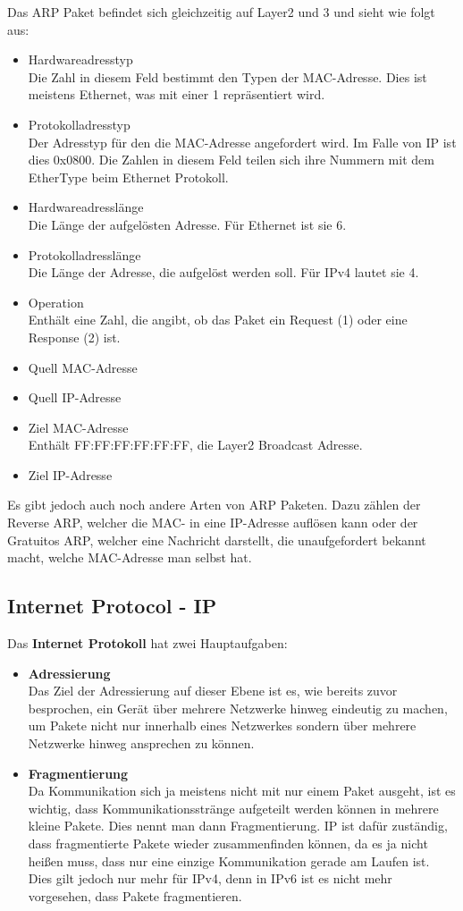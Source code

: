 \documentclass[12pt,a4paper]{report}
\begin{document}
\begin{onehalfspace}
Das ARP Paket befindet sich gleichzeitig auf Layer2 und 3 und sieht wie folgt aus:\\
\begin{itemize}
\item Hardwareadresstyp\\
Die Zahl in diesem Feld bestimmt den Typen der MAC-Adresse. Dies ist meistens Ethernet, was mit einer 1 repräsentiert wird.
\item Protokolladresstyp\\
Der Adresstyp für den die MAC-Adresse angefordert wird. Im Falle von IP ist dies 0x0800. Die Zahlen in diesem Feld teilen sich ihre Nummern mit dem EtherType beim Ethernet Protokoll.
\item Hardwareadresslänge\\
Die Länge der aufgelösten Adresse. Für Ethernet ist sie 6.
\item Protokolladresslänge\\
Die Länge der Adresse, die aufgelöst werden soll. Für IPv4 lautet sie 4.
\item Operation\\
Enthält eine Zahl, die angibt, ob das Paket ein Request (1) oder eine Response (2) ist.
\item Quell MAC-Adresse
\item Quell IP-Adresse
\item Ziel MAC-Adresse\\
Enthält FF:FF:FF:FF:FF:FF, die Layer2 Broadcast Adresse.
\item Ziel IP-Adresse
\end{itemize}
Es gibt jedoch auch noch andere Arten von ARP Paketen. Dazu zählen der Reverse ARP, welcher die MAC- in eine IP-Adresse auflösen kann oder der Gratuitos ARP, welcher eine Nachricht darstellt, die unaufgefordert bekannt macht, welche MAC-Adresse man selbst hat.
\subsection{Internet Protocol - IP}\label{ssec:ip}
Das \textbf{Internet Protokoll} hat zwei Hauptaufgaben:
\begin{itemize}
\item \textbf{Adressierung}\\
Das Ziel der Adressierung auf dieser Ebene ist es, wie bereits zuvor besprochen, ein Gerät über mehrere Netzwerke hinweg eindeutig zu machen, um Pakete nicht nur innerhalb eines Netzwerkes sondern über mehrere Netzwerke hinweg ansprechen zu können.
\item \textbf{Fragmentierung}\\
Da Kommunikation sich ja meistens nicht mit nur einem Paket ausgeht, ist es wichtig, dass Kommunikationsstränge aufgeteilt werden können in mehrere kleine Pakete. Dies nennt man dann Fragmentierung. IP ist dafür zuständig, dass fragmentierte Pakete wieder zusammenfinden können, da es ja nicht heißen muss, dass nur eine einzige Kommunikation gerade am Laufen ist.\\
Dies gilt jedoch nur mehr für IPv4, denn in IPv6 ist es nicht mehr vorgesehen, dass Pakete fragmentieren.
\end{itemize}

\end{onehalfspace}
\end{document}
